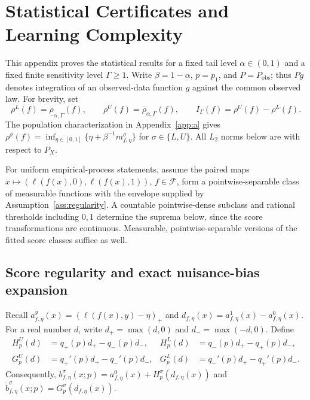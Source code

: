 \section{Statistical Certificates and Learning Complexity}
\label{app:b}

This appendix proves the statistical results for a fixed tail level
$\alpha\in(0,1)$ and a fixed finite sensitivity level $\Gamma\geq 1$.
Write $\beta=1-\alpha$, $p=p_1$, and $P=P_{\mathrm{obs}}$; thus $Pg$
denotes integration of an observed-data function $g$ against the common
observed law. For brevity, set
\[
 \rho^L(f)=\underline{\rho}_{\alpha,\Gamma}(f),\qquad
 \rho^U(f)=\overline{\rho}_{\alpha,\Gamma}(f),\qquad
 I_\Gamma(f)=\rho^U(f)-\rho^L(f).
\]
The population characterization in Appendix~\ref{app:a} gives
$\rho^\sigma(f)=\inf_{\eta\in[0,1]}
\{\eta+\beta^{-1}m^\sigma_{f,\eta}\}$ for
$\sigma\in\{L,U\}$. All $L_2$ norms below are with respect to $P_X$.

For uniform empirical-process statements, assume the paired maps
$x\mapsto(\ell(f(x),0),\ell(f(x),1))$, $f\in\mathcal F$, form a pointwise-separable
class of measurable functions with the envelope supplied by
Assumption~\ref{ass:regularity}. A countable pointwise-dense subclass and
rational thresholds including $0,1$ determine the suprema below, since the
score transformations are continuous. Measurable, pointwise-separable
versions of the fitted score classes suffice as well.

\subsection{Score regularity and exact nuisance-bias expansion}
\label{app:score-bias}

Recall $a^y_{f,\eta}(x)=(\ell(f(x),y)-\eta)_+$ and
$d_{f,\eta}(x)=a^1_{f,\eta}(x)-a^0_{f,\eta}(x)$. For a real number $d$,
write $d_+=\max(d,0)$ and $d_-=\max(-d,0)$. Define
\begin{align}
 H_p^U(d)&=q_+(p)d_+-q_-(p)d_-,&
 H_p^L(d)&=q_-(p)d_+-q_+(p)d_-, \label{eq:b:H}\\
 G_p^U(d)&=q_+'(p)d_+-q_-'(p)d_-,&
 G_p^L(d)&=q_-'(p)d_+-q_+'(p)d_- . \label{eq:b:G}
\end{align}
Consequently,
$b^\sigma_{f,\eta}(x;p)=a^0_{f,\eta}(x)+H_p^\sigma(d_{f,\eta}(x))$
and $\dot b^\sigma_{f,\eta}(x;p)=G_p^\sigma(d_{f,\eta}(x))$.

